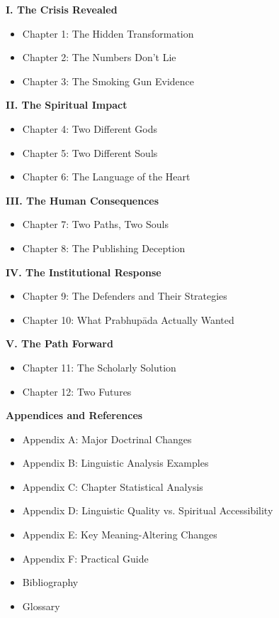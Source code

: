 \documentclass[11pt,twoside]{book}
\begin{document}
\textbf{I.  The Crisis Revealed}
\begin{itemize}
\item Chapter 1: The Hidden Transformation
\item Chapter 2: The Numbers Don't Lie
\item Chapter 3: The Smoking Gun Evidence
\end{itemize}

\textbf{II.  The Spiritual Impact}
\begin{itemize}
\item Chapter 4: Two Different Gods
\item Chapter 5: Two Different Souls
\item Chapter 6: The Language of the Heart
\end{itemize}

\textbf{III.  The Human Consequences}
\begin{itemize}
\item Chapter 7: Two Paths, Two Souls
\item Chapter 8: The Publishing Deception
\end{itemize}

\textbf{IV.  The Institutional Response}
\begin{itemize}
\item Chapter 9: The Defenders and Their Strategies
\item Chapter 10: What Prabhupāda Actually Wanted
\end{itemize}

\newpage
\thispagestyle{empty}

\textbf{V.  The Path Forward}
\begin{itemize}
\item Chapter 11: The Scholarly Solution
\item Chapter 12: Two Futures
\end{itemize}

\textbf{Appendices and References}
\begin{itemize}
\item Appendix A: Major Doctrinal Changes
\item Appendix B: Linguistic Analysis Examples
\item Appendix C: Chapter Statistical Analysis
\item Appendix D: Linguistic Quality vs. Spiritual Accessibility
\item Appendix E: Key Meaning-Altering Changes
\item Appendix F: Practical Guide
\item Bibliography
\item Glossary
\end{itemize}
\end{document}
